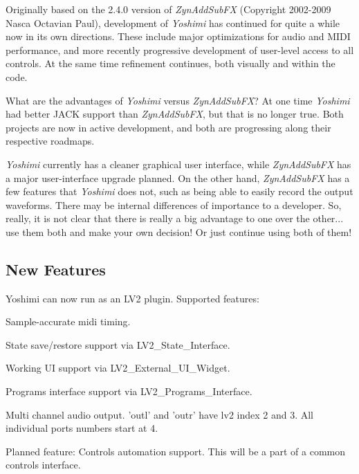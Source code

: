 \documentclass[
 11pt,
 twoside,
 a4paper,
 headinclude,
 footinclude,
 final                                 %
]{article}
\begin{document}
   Originally based on the 2.4.0 version of \textsl{ZynAddSubFX} (Copyright
   2002-2009 Nasca Octavian Paul), development of \textsl{Yoshimi} has
   continued for quite a while now in its own directions. These include
   major optimizations for audio and MIDI performance, and more recently
   progressive development of user-level access to all controls. At the same
   time refinement continues, both visually and within the code.

   What are the advantages of
   \textsl{Yoshimi} versus \textsl{ZynAddSubFX}?
   At one time \textsl{Yoshimi} had better JACK support
   than \textsl{ZynAddSubFX}, but that is no longer true.
   Both projects are now in active development, and both are
   progressing along their respective roadmaps.

   \textsl{Yoshimi} currently has a cleaner graphical user interface, while
   \textsl{ZynAddSubFX} has a major user-interface upgrade planned.
   On the other hand, \textsl{ZynAddSubFX} has a few features that
   \textsl{Yoshimi} does not, such as being able to easily record
   the output waveforms.  There may be internal differences of importance to
   a developer.  So, really, it is not clear that there is really a big
   advantage to one over the other... use them both and make your own
   decision!  Or just continue using both of them!

\subsection{New Features}
\label{subsec:introduction_new_features}

   Yoshimi can now run as an LV2 plugin.  Supported features:

   \begin{enumber}
      \item Sample-accurate midi timing.
      \item State save/restore support via LV2\_State\_Interface.
      \item Working UI support via LV2\_External\_UI\_Widget.
      \item Programs interface support via LV2\_Programs\_Interface.
      \item Multi channel audio output.
         'outl' and 'outr' have lv2 index 2 and 3.
         All individual ports numbers start at 4.
   \end{enumber}

   Planned feature:
   Controls automation support.
   This will be a part of a common controls interface.
\end{document}
